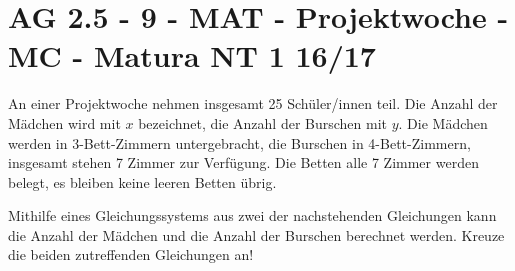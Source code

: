 \section{AG 2.5 - 9 - MAT - Projektwoche - MC - Matura NT 1 16/17}

\begin{beispiel}[AG 2.5]{1} %
An einer Projektwoche nehmen insgesamt 25 Schüler/innen teil. Die Anzahl der Mädchen wird mit $x$ bezeichnet, die Anzahl der Burschen mit $y$. Die Mädchen werden in 3-Bett-Zimmern untergebracht, die Burschen in 4-Bett-Zimmern, insgesamt stehen 7 Zimmer zur Verfügung. Die Betten alle 7 Zimmer werden belegt, es bleiben keine leeren Betten übrig.

Mithilfe eines Gleichungssystems aus zwei der nachstehenden Gleichungen kann die Anzahl der Mädchen und die Anzahl der Burschen berechnet werden. Kreuze die beiden zutreffenden Gleichungen an!

\end{beispiel}